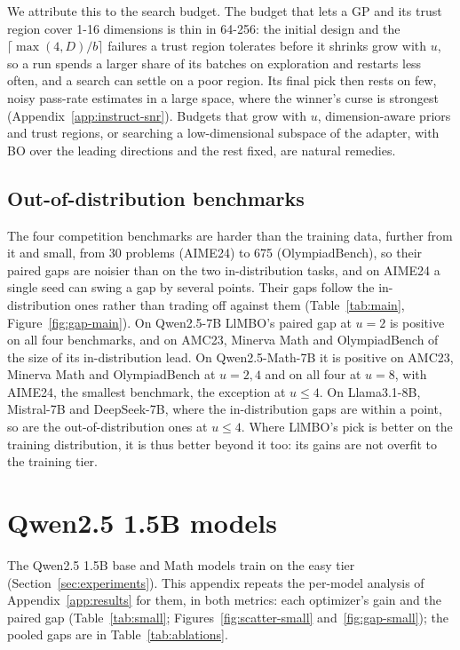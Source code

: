 \documentclass[twoside]{article}
\newcommand{\llmbo}{LlMBO}
\begin{document}
We attribute this to the search budget. The budget that lets a GP and its trust region cover 1-16 dimensions is thin in 64-256: the initial design and the $\lceil \max(4, D)/b \rceil$ failures a trust region tolerates before it shrinks grow with $u$, so a run spends a larger share of its batches on exploration and restarts less often, and a search can settle on a poor region. Its final pick then rests on few, noisy pass-rate estimates in a large space, where the winner's curse is strongest (Appendix~\ref{app:instruct-snr}). Budgets that grow with $u$, dimension-aware priors and trust regions, or searching a low-dimensional subspace of the adapter, with BO over the leading directions and the rest fixed, are natural remedies.

\FloatBarrier
\subsection{Out-of-distribution benchmarks}
\label{app:results-ood}

The four competition benchmarks are harder than the training data, further from it and small, from 30 problems (AIME24) to 675 (OlympiadBench), so their paired gaps are noisier than on the two in-distribution tasks, and on AIME24 a single seed can swing a gap by several points. Their gaps follow the in-distribution ones rather than trading off against them (Table~\ref{tab:main}, Figure~\ref{fig:gap-main}). On Qwen2.5-7B \llmbo{}'s paired gap at $u = 2$ is positive on all four benchmarks, and on AMC23, Minerva Math and OlympiadBench of the size of its in-distribution lead. On Qwen2.5-Math-7B it is positive on AMC23, Minerva Math and OlympiadBench at $u = 2, 4$ and on all four at $u = 8$, with AIME24, the smallest benchmark, the exception at $u \le 4$. On Llama3.1-8B, Mistral-7B and DeepSeek-7B, where the in-distribution gaps are within a point, so are the out-of-distribution ones at $u \le 4$. Where \llmbo{}'s pick is better on the training distribution, it is thus better beyond it too: its gains are not overfit to the training tier.

\FloatBarrier
\clearpage
\section{Qwen2.5 1.5B models}
\label{app:small}
\label{sec:small}
\label{sec:sizes}
\label{app:greedy-small}
The Qwen2.5 1.5B base and Math models train on the easy tier (Section~\ref{sec:experiments}). This appendix repeats the per-model analysis of Appendix~\ref{app:results} for them, in both metrics: each optimizer's gain and the paired gap (Table~\ref{tab:small}; Figures~\ref{fig:scatter-small} and~\ref{fig:gap-small}); the pooled gaps are in Table~\ref{tab:ablations}.
\end{document}
